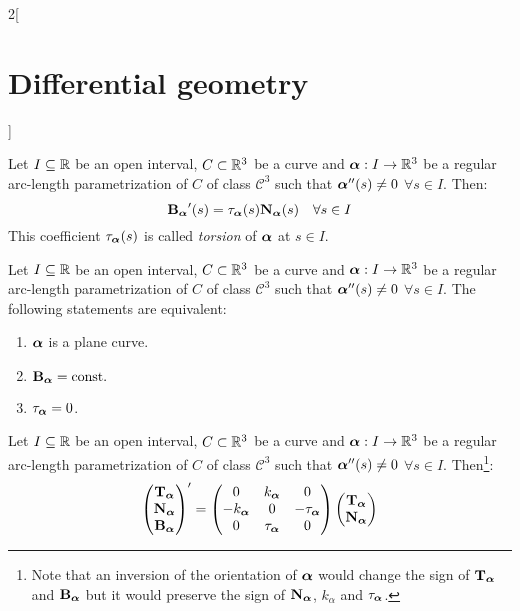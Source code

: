 \documentclass[../../../main.tex]{subfiles}
\begin{document}
\begin{multicols}{2}[\section{Differential geometry}]
  \begin{proposition}
    Let $I\subseteq\RR$ be an open interval, $C\subset\RR^3$ be a curve and $\vf{\alpha}:I\rightarrow\RR^3$ be a regular arc-length parametrization of $C$ of class $\mathcal{C}^3$ such that $\vf{\alpha}''(s)\ne 0$ $\forall s\in I$. Then: $$\B\alpha'(s)=\ta\alpha(s)\N\alpha(s)\quad\forall s\in I$$ This coefficient $\ta\alpha(s)$ is called \emph{torsion} of $\vf{\alpha}$ at $s\in I$.
  \end{proposition}
  \begin{proposition}
    Let $I\subseteq\RR$ be an open interval, $C\subset\RR^3$ be a curve and $\vf{\alpha}:I\rightarrow\RR^3$ be a regular arc-length parametrization of $C$ of class $\mathcal{C}^3$ such that $\vf{\alpha}''(s)\ne 0$ $\forall s\in I$. The following statements are equivalent:
    \begin{enumerate}
      \item $\vf{\alpha}$ is a plane curve.
      \item $\B\alpha=\const$
      \item $\ta\alpha=0$.
    \end{enumerate}
  \end{proposition}
  \begin{theorem}
    Let $I\subseteq\RR$ be an open interval, $C\subset\RR^3$ be a curve and $\vf{\alpha}:I\rightarrow\RR^3$ be a regular arc-length parametrization of $C$ of class $\mathcal{C}^3$ such that $\vf{\alpha}''(s)\ne 0$ $\forall s\in I$. Then\footnote{Note that an inversion of the orientation of $\vf\alpha$ would change the sign of $\T\alpha$ and $\B\alpha$ but it would preserve the sign of $\N\alpha$, $k_{\alpha}$ and $\ta\alpha$.}:
    $$
      \begin{pmatrix}
        \T\alpha \\
        \N\alpha \\
        \B\alpha \\
      \end{pmatrix}'=
      \begin{pmatrix}
        0              & k_{\vf\alpha} & 0          \\
        -k_{\vf\alpha} & 0             & -\ta\alpha \\
        0              & \ta\alpha     & 0
      \end{pmatrix}
      \begin{pmatrix}
        \T\alpha \\
        \N\alpha \\

\end{pmatrix}$$
\end{theorem}
\end{multicols}
\end{document}
